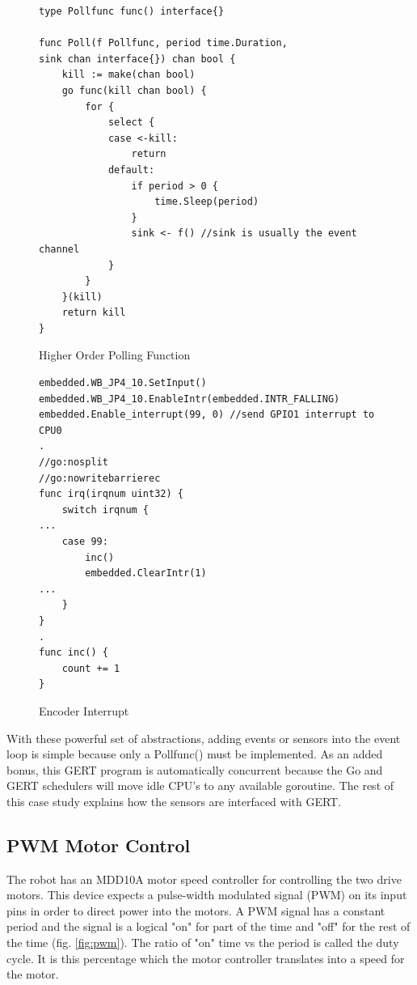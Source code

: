 \begin{figure}[!h]
\begin{center}
\begin{lstlisting}
type Pollfunc func() interface{}

func Poll(f Pollfunc, period time.Duration,
sink chan interface{}) chan bool {
	kill := make(chan bool)
	go func(kill chan bool) {
		for {
			select {
			case <-kill:
				return
			default:
				if period > 0 {
					time.Sleep(period)
				}
				sink <- f() //sink is usually the event channel
			}
		}
	}(kill)
	return kill
}
\end{lstlisting}
\end{center}
  \caption{Higher Order Polling Function} \label{fig:poll_func}
\end{figure}


\begin{figure}[!h]
\begin{center}
\begin{lstlisting}
embedded.WB_JP4_10.SetInput()
embedded.WB_JP4_10.EnableIntr(embedded.INTR_FALLING)
embedded.Enable_interrupt(99, 0) //send GPIO1 interrupt to CPU0
.
//go:nosplit
//go:nowritebarrierec
func irq(irqnum uint32) {
	switch irqnum {
...
	case 99:
		inc()
		embedded.ClearIntr(1)
...
	}
}
.
func inc() {
	count += 1
}

\end{lstlisting}
\end{center}
  \caption{Encoder Interrupt} \label{fig:encoder}
\end{figure}

With these powerful set of abstractions, adding events or sensors into the event loop
is simple because only a Pollfunc() must be implemented. As an added bonus, this
GERT program is automatically concurrent because the Go and GERT schedulers will
move idle CPU's to any available goroutine. The rest of this case study explains how the sensors
are interfaced with GERT.


\subsection{PWM Motor Control}
The robot has an MDD10A motor speed controller for controlling the two drive motors. This device
expects a pulse-width modulated signal (PWM) on its input pins in order to direct power into the
motors. A PWM signal has a constant period and the signal is a logical "on" for part of the time
and "off" for the rest of the time (fig. \ref{fig:pwm}). The ratio of "on" time vs the period is called the duty cycle.
It is this percentage which the motor controller translates into a speed for the motor.


